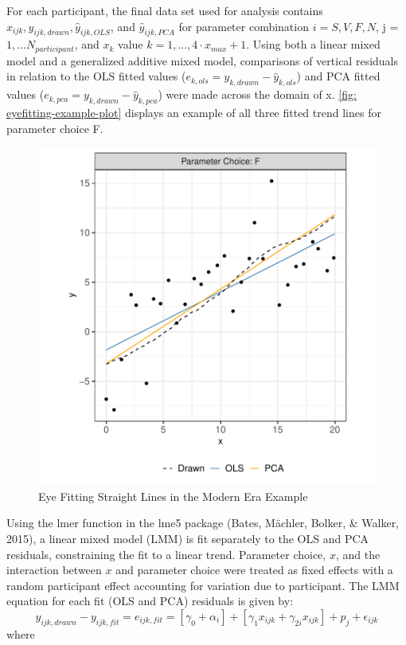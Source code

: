 \documentclass[print]{nuthesis}
\begin{document}
For each participant, the final data set used for analysis contains \(x_{ijk}, y_{ijk,drawn}, \hat y_{ijk,OLS}\), and \(\hat y_{ijk,PCA}\) for parameter combination \(i = S, V, F, N\), j = \(1,...N_{participant}\), and \(x_{k}\) value \(k = 1, ...,4\cdot x_{max} +1\).
Using both a linear mixed model and a generalized additive mixed model, comparisons of vertical residuals in relation to the OLS fitted values (\(e_{k,ols} = y_{k,drawn} - \hat y_{k,ols}\)) and PCA fitted values (\(e_{k,pca} = y_{k,drawn} - \hat y_{k,pca}\)) were made across the domain of x.
\cref{fig: eyefitting-example-plot} displays an example of all three fitted trend lines for parameter choice F.

\begin{figure}[tbp]

{\centering \includegraphics[width=0.75\linewidth,]{thesis_files/figure-latex/eyefitting-example-plot-1} 

}

\caption{Eye Fitting Straight Lines in the Modern Era Example}\label{fig:eyefitting-example-plot}
\end{figure}

Using the lmer function in the lme5 package (Bates, Mächler, Bolker, \& Walker, 2015), a linear mixed model (LMM) is fit separately to the OLS and PCA residuals, constraining the fit to a linear trend.
Parameter choice, \(x\), and the interaction between \(x\) and parameter choice were treated as fixed effects with a random participant effect accounting for variation due to participant.
The LMM equation for each fit (OLS and PCA) residuals is given by:
\begin{equation}
y_{ijk,drawn} - y_{ijk,fit} = e_{ijk,fit} = \left[\gamma_0 + \alpha_i\right] + \left[\gamma_{1} x_{ijk} + \gamma_{2i} x_{ijk}\right] + p_{j} + \epsilon_{ijk}
\end{equation}
\noindent where
\end{document}
